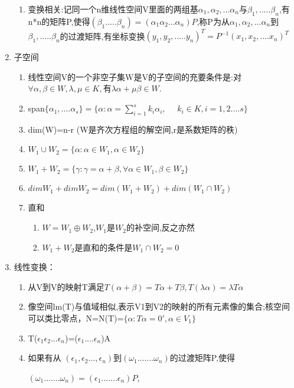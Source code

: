 \documentclass[11pt, a4paper, UTF8]{ctexart}
\begin{document}
\begin{solution}
\begin{enumerate}
\begin{enumerate}
      \item 变换相关:记同一个n维线性空间V里面的两组基$\alpha _1 ,\alpha _2,...\alpha _n$与$\beta _1,.....\beta _n$,有n*n的矩阵P,使得$(\beta _1.....\beta _n)=(\alpha _1 \alpha _2...\alpha _n)P$,称P为从$\alpha _1 ,\alpha _2,...\alpha _n$到$\beta _1,.....\beta _n$的过渡矩阵,有坐标变换$(y_1,y_2,.....y_n)^{T}=P^{-1}(x_1,x_2,....x_n)^{T}$
    \end{enumerate}
    \item 子空间
    \begin{enumerate}
      \item 线性空间V的一个非空子集W是V的子空间的充要条件是:对$\forall \alpha,\beta \in W, \lambda,\mu \in K,$有$\lambda \alpha +\mu \beta \in W.$
      \item span$\{\alpha _1,....\alpha _s\}=\{\alpha :
      \alpha =\sum _{i=1}^{s} k_i \alpha _i,~~~~~~k_i \in K,i=1,2....s\}$
      \item dim(W)=n-r (W是齐次方程组的解空间,r是系数矩阵的秩)
      \item $W_1 \cup W_2 =\{\alpha : \alpha \in W_1 ,\alpha \in W_2\}$
      \item $W_1 + W_2=\{\gamma : \gamma =\alpha+\beta, \forall \alpha \in W_1,\beta \in W_2\}$
      \item $dimW_1+dimW_2=dim(W_1+W_2)+dim(W_1\cap W_2)$
      \item 直和
      \begin{enumerate}
        \item $W=W_1\oplus W_2$,$W_1$是$W_2$的补空间,反之亦然
      \item  $W_1+W_2$是直和的条件是$W_1\cap W_2={0}$
      \end{enumerate}
    \end{enumerate}
    \item 线性变换：
    \begin{enumerate}
      \item 从V到V的映射T满足$T(\alpha+\beta)=T\alpha +T\beta , T(\lambda \alpha)=\lambda T \alpha $
      \item 像空间lm(T)与值域相似,表示V1到V2的映射的所有元素像的集合;核空间可以类比零点，N=N(T)=$\{\alpha :T\alpha =0',\alpha \in V_1\}$
      \item T($\epsilon _1 \epsilon _2 ...\epsilon _n $)=($\epsilon _1....\epsilon _n$)A
      \item 如果有从
      $(\epsilon _1,\epsilon _2 ...,\epsilon _n )$到$(\omega _1.......\omega _n)$的过渡矩阵P,使得
      
      $(\omega _1.......\omega _n)=(\epsilon _1.......\epsilon _n)P$,


\end{enumerate}
\end{enumerate}
\end{solution}
\end{document}
